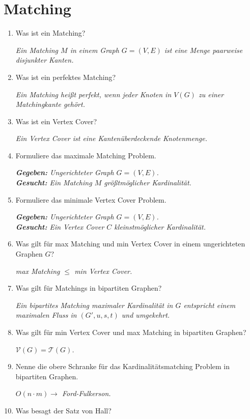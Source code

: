 \documentclass[a4paper,10pt]{scrreprt}
\begin{document}
	\section{Matching}
	\begin{enumerate}
		\item Was ist ein Matching?
		
		\textit{Ein Matching $M$ in einem Graph $G=(V,E)$ ist eine Menge paarweise disjunkter Kanten.}
		\item Was ist ein perfektes Matching?
		
		\textit{Ein Matching heißt perfekt, wenn jeder Knoten in $V(G)$ zu einer Matchingkante gehört.}
		\item Was ist ein Vertex Cover?
		
		\textit{Ein Vertex Cover ist eine Kantenüberdeckende Knotenmenge.}
		\item Formuliere das maximale Matching Problem.
		
			\textit{\hspace*{10pt}\textbf{Gegeben: }Ungerichteter Graph $G = (V,E)$.\\[5pt]
			\hspace*{10pt}\textbf{Gesucht: }Ein Matching $M$ größtmöglicher Kardinalität.}
		\item Formuliere das minimale Vertex Cover Problem.
		
			\textit{\hspace*{10pt}\textbf{Gegeben: }Ungerichteter Graph $G = (V,E)$.\\[5pt]
			\hspace*{10pt}\textbf{Gesucht: }Ein Vertex Cover $C$ kleinstmöglicher Kardinalität.}
		\item Was gilt für max Matching und min Vertex Cover in einem ungerichteten Graphen $G$?
		
		\textit{max Matching $\le$ min Vertex Cover.}
		\item Was gilt für Matchings in bipartiten Graphen?
		
		\textit{Ein bipartites Matching maximaler Kardinalität in $G$ entspricht einem maximalen Fluss in $(G',u,s,t)$ und umgekehrt.}
		\item Was gilt für min Vertex Cover und max Matching in bipartiten Graphen?
		
		\textit{$\mathcal{V}(G) = \mathcal{T}(G)$.}
		\item Nenne die obere Schranke für das Kardinalitätsmatching Problem in bipartiten Graphen.
		
		\textit{$O(n\cdot m)\to$ Ford-Fulkerson.}
		\item Was besagt der Satz von Hall?
		

\end{enumerate}
\end{document}
